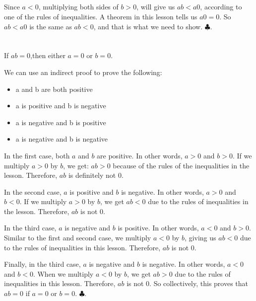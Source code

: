 \documentclass{article}
\begin{document}
\subsection{}

Since $a<0$, multiplying both sides of $b > 0$, will give us $ab < a0$, according to one of the rules of inequalities. A theorem in this lesson tells us $a0 = 0$. So $ab < a0$ is the same as $ab < 0$, and that is what we need to show. $\clubsuit$.

\section{}


If $ab=0$,then either $a=0$ or $b=0$.

We can use an indirect proof to prove the following:

\begin{itemize}
    \item a and b are both positive
    \item a is positive and b is negative
    \item a is negative and b is positive
    \item a is negative and b is negative
\end{itemize}

In the first case, both $a$ and $b$ are positive. In other words, $a >0$ and $b > 0$. If we multiply $a > 0$ by $b$, we get: $ab >0$ because of the rules of the inequalities in the lesson. Therefore, $ab$ is definitely not 0. 

In the second case, $a$ is positive and $b$ is negative. In other words, $a > 0$ and $b < 0$. If we multiply $a > 0$ by $b$, we get $ab < 0$ due to the rules of inequalities in the lesson. Therefore, $ab$ is not 0.

In the third case, $a$ is negative and $b$ is positive. In other words, $a < 0$ and $b > 0$. Similar to the first and second case, we multiply $a < 0$ by $b$, giving us $ab < 0$ due to the rules of inequalities in this lesson. Therefore, $ab$ is not 0.

Finally, in the third case, $a$ is negative and $b$ is negative. In other words, $a < 0$ and $b < 0$. When we multiply $a < 0$ by $b$, we get $ab > 0$ due to the rules of inequalities in this lesson. Therefore, $ab$ is not 0. So collectively, this proves that $ab=0$ if $a=0$ or $b=0$. $\clubsuit$.

\section{}
\end{document}
